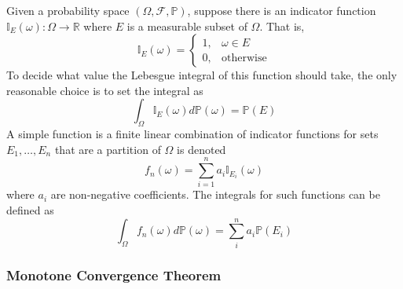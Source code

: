 \documentclass[11pt]{report} %
\begin{document}
Given a probability space $\left(\Omega, \mathcal{F}, \mathbb{P}\right)$, suppose there is an indicator function $\mathbb{I}_{E}\left(\omega\right): \Omega \to \mathbb{R}$ where $E$ is a measurable subset of $\Omega$. That is,
\begin{equation}
\mathbb{I}_{E}\left(\omega\right) = \begin{cases} 1, & \omega \in E \\ 0, & \mathrm{otherwise}\end{cases}
\end{equation}
To decide what value the Lebesgue integral of this function should take, the only reasonable choice is to set the integral as
\begin{equation}
\int_{\Omega}\mathbb{I}_{E}\left(\omega\right)d\mathbb{P}\left(\omega\right) = \mathbb{P}\left(E\right)
\end{equation}
A simple function is a finite linear combination of indicator functions for sets $E_{1}, \dots, E_{n}$ that are a partition of $\Omega$ is denoted
\begin{equation}
f_{n}\left(\omega\right) = \sum_{i = 1}^{n}a_{i}\mathbb{I}_{E_{i}}\left(\omega\right)
\end{equation}
where $a_{i}$ are non-negative coefficients. The integrals for such functions can be defined as
\begin{equation}
\int_{\Omega}f_{n}\left(\omega\right)d\mathbb{P}\left(\omega\right) = \sum_{i}^{n}a_{i}\mathbb{P}\left(E_{i}\right)
\end{equation}

\subsubsection{Monotone Convergence Theorem}
\end{document}
